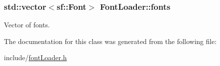\subsubsection[{\texorpdfstring{fonts}{fonts}}]{\setlength{\rightskip}{0pt plus 5cm}std\+::vector$<$sf\+::\+Font$>$ Font\+Loader\+::fonts\hspace{0.3cm}{\ttfamily [private]}}\hypertarget{class_font_loader_abe3d75dec9d31a88cbfc889df83d2916}{}\label{class_font_loader_abe3d75dec9d31a88cbfc889df83d2916}
Vector of fonts. 

The documentation for this class was generated from the following file\+:\begin{DoxyCompactItemize}
\item 
include/\hyperlink{font_loader_8h}{font\+Loader.\+h}\end{DoxyCompactItemize}
